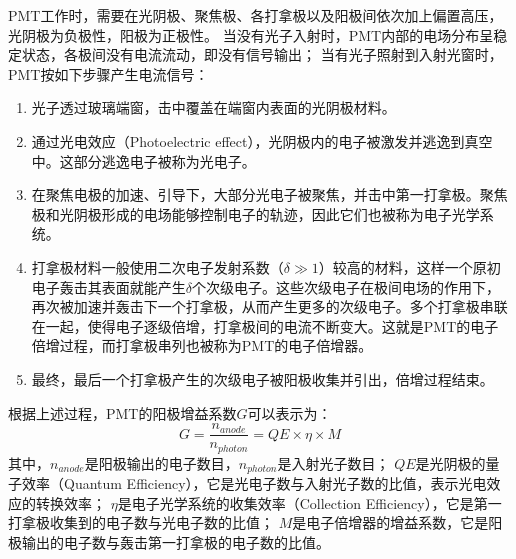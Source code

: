 PMT工作时，需要在光阴极、聚焦极、各打拿极以及阳极间依次加上偏置高压，光阴极为负极性，阳极为正极性。
当没有光子入射时，PMT内部的电场分布呈稳定状态，各极间没有电流流动，即没有信号输出；
当有光子照射到入射光窗时，PMT按如下步骤产生电流信号：
\begin{enumerate}
	\item 光子透过玻璃端窗，击中覆盖在端窗内表面的光阴极材料。
	\item 通过光电效应（Photoelectric effect），光阴极内的电子被激发并逃逸到真空中。这部分逃逸电子被称为光电子。
	\item 在聚焦电极的加速、引导下，大部分光电子被聚焦，并击中第一打拿极。聚焦极和光阴极形成的电场能够控制电子的轨迹，因此它们也被称为电子光学系统。
	\item 打拿极材料一般使用二次电子发射系数（$\delta\gg1$）较高的材料，这样一个原初电子轰击其表面就能产生$\delta$个次级电子。这些次级电子在极间电场的作用下，再次被加速并轰击下一个打拿极，从而产生更多的次级电子。多个打拿极串联在一起，使得电子逐级倍增，打拿极间的电流不断变大。这就是PMT的电子倍增过程，而打拿极串列也被称为PMT的电子倍增器。
	\item 最终，最后一个打拿极产生的次级电子被阳极收集并引出，倍增过程结束。%
\end{enumerate}

根据上述过程，PMT的阳极增益系数$G$可以表示为：
\begin{equation}
G = \frac{n_{anode}}{n_{photon}} = QE \times \eta \times M
\label{eq:description:pmt_gain}
\end{equation}
其中，$n_{anode}$是阳极输出的电子数目，$n_{photon}$是入射光子数目；
$QE$是光阴极的量子效率（Quantum Efficiency），它是光电子数与入射光子数的比值，表示光电效应的转换效率；
$\eta$是电子光学系统的收集效率（Collection Efficiency），它是第一打拿极收集到的电子数与光电子数的比值；
$M$是电子倍增器的增益系数，它是阳极输出的电子数与轰击第一打拿极的电子数的比值。

